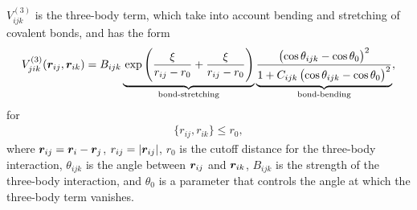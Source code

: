 $V_{ijk}^{(3)}$ is the three-body term, which take into account bending and stretching of covalent bonds, and has the form
\begin{align*}
    V^{(3)}_{jik}(\rvec_{ij}, \rvec_{ik}) = 
    B_{ijk} 
    \underbrace{ %
        \vphantom{\frac{\big)^2}{\big)^2}}\exp\left( \frac{\xi}{r_{ij} - r_0} + \frac{\xi}{r_{ij} - r_0} \right)
    }_{\text{bond-stretching}}
    \underbrace{
        \frac{\left(\cos\theta_{ijk} - \cos\theta_0\right)^2}{1 + C_{ijk}\left(\cos\theta_{ijk} - \cos\theta_0\right)^2}
    }_{\text{bond-bending}}
    ,
\end{align*}
for
\begin{align*}
    \{r_{ij}, r_{ik}\} \leq r_0,
\end{align*}
where $\boldsymbol{r}_{ij} = \boldsymbol{r}_i - \boldsymbol{r}_j$, $r_{ij} = |\boldsymbol{r}_{ij}|$, $r_0$ is the cutoff distance for the three-body interaction, $\theta_{ijk}$ is the angle between $\boldsymbol{r}_{ij}$ and $\boldsymbol{r}_{ik}$, $B_{ijk}$ is the strength of the three-body interaction, and $\theta_0$ is a parameter that controls the angle at which the three-body term vanishes.
